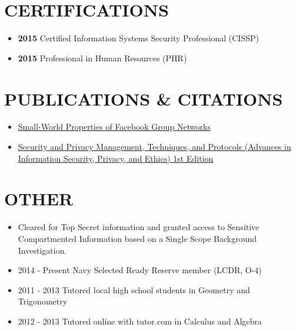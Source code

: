 \documentclass[10pt]{article}
\def\tightlist{}
\begin{document}
\hypertarget{certifications}{%
\section{CERTIFICATIONS}\label{certifications}}

\begin{itemize}
\tightlist
\item
  \textbf{2015} Certified Information Systems Security Professional
  (CISSP)
\item
  \textbf{2015} Professional in Human Resources (PHR)
\end{itemize}

\hypertarget{publications-citations}{%
\section{PUBLICATIONS \& CITATIONS}\label{publications-citations}}

\begin{itemize}
\tightlist
\item
  \href{http://wpmedia.wolfram.com/uploads/sites/13/2018/02/23-3-1.pdf}{Small-World
  Properties of Facebook Group Networks}
\item
  \href{https://smile.amazon.com/gp/product/1522555838/ref=ppx_yo_dt_b_asin_title_o02_s00?ie=UTF8\&psc=1}{Security
  and Privacy Management, Techniques, and Protocols (Advances in
  Information Security, Privacy, and Ethics) 1st Edition}
\end{itemize}

\hypertarget{other}{%
\section{OTHER}\label{other}}

\begin{itemize}
\tightlist
\item
  Cleared for Top Secret information and granted access to Sensitive
  Compartmented Information based on a Single Scope Background
  Investigation.
\item
  2014 - Present Navy Selected Ready Reserve member (LCDR, O-4)
\item
  2011 - 2013 Tutored local high school students in Geometry and
  Trigonometry
\item
  2012 - 2013 Tutored online with tutor.com in Calculus and Algebra
\end{itemize}

\end{document}
